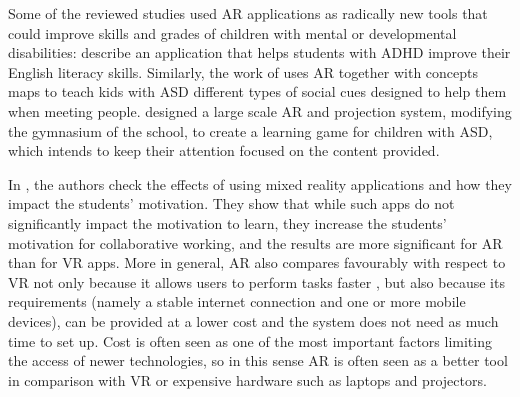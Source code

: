 Some of the reviewed studies used AR applications as radically new tools that could improve skills and grades of children with mental or developmental disabilities: \cite{luna2018words} describe an application that helps students with \gls{ADHD} improve their English literacy skills. Similarly, the work of \cite{chen2019effects} uses AR together with concepts maps to teach kids with \gls{ASD} different types of social cues designed to help them when meeting people. \cite{takahashi2018empathic} designed a large scale AR and projection system, modifying the gymnasium of the school, to create a learning game for children with \gls{ASD}, which intends to keep their attention focused on the content provided.

In \cite{258-beyoglu2020use}, the authors check the effects of using mixed reality applications and how they impact the students' motivation. They show that while such apps do not significantly impact the motivation to learn, they increase the students' motivation for collaborative working, and the results are more significant for AR than for \gls{VR} apps. More in general, AR also compares favourably with respect to \gls{VR} not only because it allows users to perform tasks faster \cite{7833028}, but also because its requirements (namely a stable internet connection and one or more mobile devices), can be provided at a lower cost and the system does not need as much time to set up. Cost is often seen as one of the most important factors limiting the access of newer technologies, so in this sense AR is often seen as a better tool in comparison with VR or expensive hardware such as laptops and projectors.
